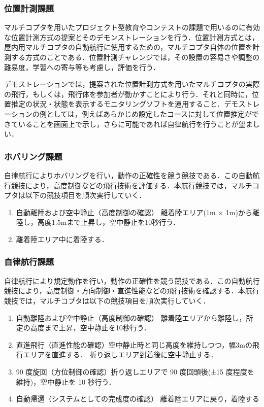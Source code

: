 \documentclass[submit]{ipsj}
\begin{document}
\subsubsection{位置計測課題}
マルチコプタを用いたプロジェクト型教育やコンテストの課題で用いるのに有効な位置計測方式の提案とそのデモンストレーションを行う．位置計測方式とは，屋内用マルチコプタの自動航行に使用するための，マルチコプタ自体の位置を計測する方式のことである．位置計測チャレンジでは，その設置の容易さや調整の難易度，学習への寄与等も考慮し，評価を行う．

デモストレーションでは，提案された位置計測方式を用いたマルチコプタの実際の飛行，もしくは，飛行体を参加者が動かすことにより行う．それと同時に，位置推定の状況・状態を表示するモニタリングソフトを運用すること．デモストレーションの例としては，例えばあらかじめ設定したコースに対して位置推定ができていることを画面上で示し，さらに可能であれば自律航行を行うことが望ましい．

\subsubsection{ホバリング課題}

自律航行によりホバリングを行い，動作の正確性を競う競技である．この自動航行競技により，高度制御などの飛行技術を評価する．本航行競技では，マルチコプタは以下の競技項目を順次実行していく．
\begin{enumerate}
\item 自動離陸および空中静止（高度制御の確認） 離着陸エリア(1m $\times$ 1m)から離陸し，高度1.5mまで上昇し，空中静止を10秒行う．
\item 離着陸エリア中に着陸する．
\end{enumerate}

\subsubsection{自律航行課題}
自律航行により規定動作を行い，動作の正確性を競う競技である．この自動航行競技により，高度制御・方向制御・直進性能などの飛行技術を確認する．本航行競技では，マルチコプタは以下の競技項目を順次実行していく．

\begin{enumerate}
\item 自動離陸および空中静止（高度制御の確認） 離着陸エリアから離陸し，所定の高度まで上昇，空中静止を10秒行う．
\item 直進飛行（直進性能の確認）空中静止時と同じ高度を維持しつつ，幅3mの飛行エリアを直進する． 折り返しエリア到着後に空中静止する．
\item 90 度旋回（方位制御の確認）折り返しエリアで 90 度回頭後(±15 度程度を維持)，空中静止を 10 秒行う．
\item 自動帰還（システムとしての完成度の確認） 離着陸エリアに戻り，着陸する
\end{enumerate}
\end{document}
